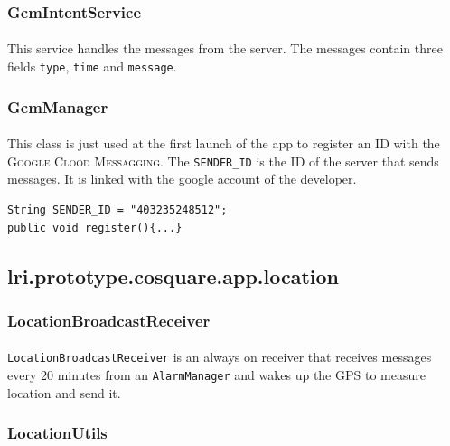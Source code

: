 \documentclass[12pt]{article}
\begin{document}
\subsubsection{GcmIntentService}
\paragraph{}This service handles the messages from the server. The messages contain three fields \verb?type?, \verb?time? and \verb?message?.

\subsubsection{GcmManager}
\paragraph{}This class is just used at the first launch of the app to register an ID with the \textsc{Google Clood Messagging}. The \verb?SENDER_ID? is the ID of the server that sends messages. It is linked with the google account of the developer.

\begin{verbatim}
String SENDER_ID = "403235248512";
public void register(){...}
\end{verbatim}


\subsection{lri.prototype.cosquare.app.location}
\subsubsection{LocationBroadcastReceiver}
\paragraph{} \verb?LocationBroadcastReceiver? is an always on receiver that receives messages every 20 minutes from an \verb?AlarmManager? and wakes up the GPS to measure location and send it.


\subsubsection{LocationUtils}
\end{document}
